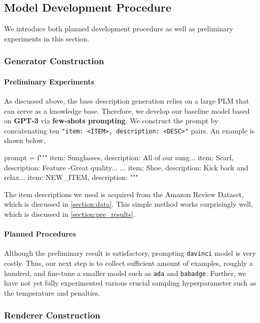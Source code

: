 \documentclass[12pt]{article}
\begin{document}
  \subsection{Model Development Procedure}
    We introduce both planned development procedure as well as 
      preliminary experiments in this section.

    \subsubsection{Generator Construction}
      \paragraph{Preliminary Experiments} As discussed above, the base description generation relies on a 
        large PLM that can serve as a knowledge base. Therefore, we develop our baseline model based 
        on \textbf{GPT-3} via \textbf{few-shots prompting}. We construct the prompt by concatenating 
        ten \lstinline{"item: <ITEM>, description: <DESC>"} pairs. An example is shown below,
        \begin{python}

              prompt = f"""
              item: Sunglasses, description: All of our sung...
              item: Scarf, description: Feature -Great quality...
                                  ...
              item: Shoe, description: Kick back and relax...
              item: {NEW_ITEM}, description:
              """
        \end{python}
        The item descriptions we used is acquired from the Amazon Review Dataset, which is discussed 
          in \cref{section:data}. This simple method works surprisingly well, which is discussed in
          \cref{section:pre_results}.
      
      \paragraph{Planned Procedures} Although the preliminary result is satisfactory, prompting \lstinline{davinci} model
        is very costly. Thus, our next step is to collect sufficient amount of examples, roughly a hundred, and fine-tune a 
        smaller model such as \lstinline{ada} and \lstinline{babadge}. Further, we have not yet fully experimented various 
        crucial sampling hyperparameter such as the temperature and penalties. 

    \subsubsection{Renderer Construction}
\end{document}
